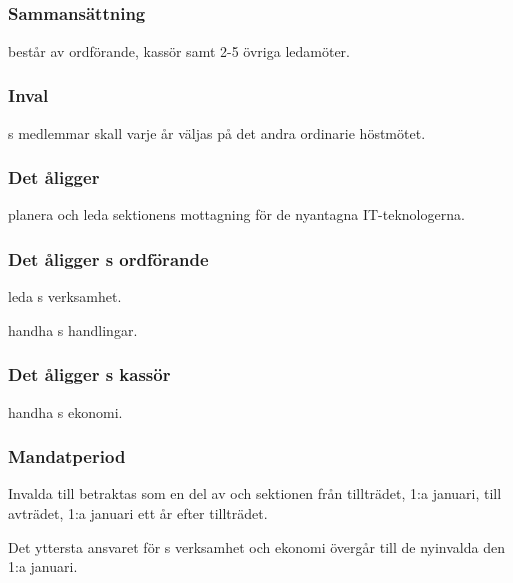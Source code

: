 \subsection{\NOLLKITFULL}
\subsubsection{Sammansättning}
\NOLLKIT{} består av ordförande, kassör samt 2-5 övriga ledamöter.

\subsubsection{Inval}
\NOLLKIT{}s medlemmar skall varje år väljas på det andra ordinarie höstmötet.

\subsubsection{Det åligger \NOLLKIT}
\begin{att}
	\item planera och leda sektionens mottagning för de nyantagna IT-teknologerna.
\end{att}

\subsubsection{Det åligger \NOLLKIT{}s ordförande}
\begin{att}
	\item leda \NOLLKIT{}s verksamhet.
	\item handha \NOLLKIT{}s handlingar.
\end{att}

\subsubsection{Det åligger \NOLLKIT{}s kassör}
\begin{att}
	\item handha \NOLLKIT{}s ekonomi.
\end{att}

\subsubsection{Mandatperiod}
Invalda till \NOLLKIT{} betraktas som en del av \NOLLKIT{} och sektionen från tillträdet, 1:a januari, till avträdet, 1:a januari ett år efter tillträdet.

Det yttersta ansvaret för \NOLLKIT{}s verksamhet och ekonomi övergår till de nyinvalda den 1:a januari.